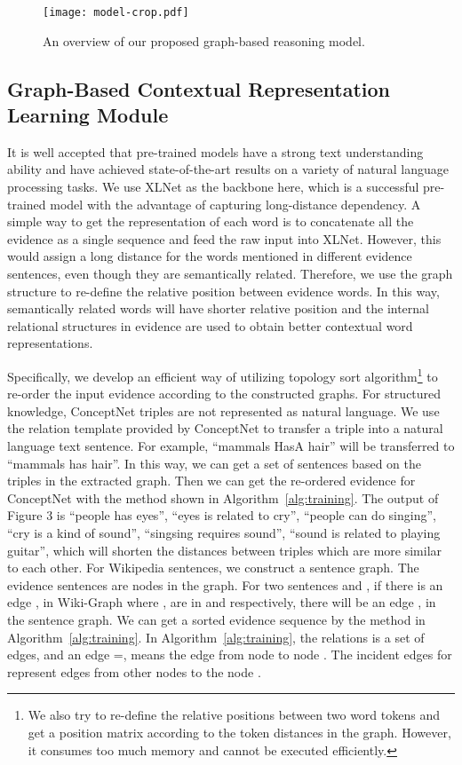 \documentclass[letterpaper]{article} \usepackage{aaai20}  \usepackage{times}  \usepackage{helvet} \usepackage{courier}  \usepackage[hyphens]{url}  \usepackage{graphicx} \urlstyle{rm} \def\UrlFont{\rm}  \usepackage{graphicx}  \frenchspacing  \setlength{\pdfpagewidth}{8.5in}  \setlength{\pdfpageheight}{11in}
\begin{document}
\begin{figure}[htbp]
	\centering
	\texttt{[image: model-crop.pdf]}
	\caption{An overview of our proposed graph-based reasoning model.}
	\label{fig:model}
\end{figure}

\subsection{Graph-Based Contextual Representation Learning Module}

It is well accepted that pre-trained models have a strong text understanding ability and have achieved state-of-the-art results on a variety of natural language processing tasks. 
We use XLNet \cite{xlnet2019yang} as the backbone here, which is a successful pre-trained model with the advantage of capturing long-distance dependency.
A simple way to get the representation of each word is to concatenate all the evidence as a single sequence and feed the raw input into XLNet.
However, this would assign a long distance for the words mentioned in different evidence sentences, even though they are semantically related.
Therefore, we use the graph structure to re-define the relative position between evidence words. In this way, semantically related words will have shorter relative position and the internal relational structures in evidence are used to obtain better contextual word representations.

Specifically, we develop an efficient way of utilizing topology sort algorithm\footnote{We also try to re-define the relative positions between two word tokens and get a position matrix according to the token distances in the graph. However, it consumes too much memory and cannot be executed efficiently.} to re-order the input evidence according to the constructed graphs. 
For structured knowledge, ConceptNet triples are not represented as natural language. We use the relation template provided by ConceptNet to transfer a triple into a natural language text sentence.
For example, ``mammals HasA hair'' will be transferred to ``mammals has hair''. In this way, we can get a set of sentences  based on the triples in the extracted graph. Then we can get the re-ordered evidence  for  ConceptNet  with the method shown in Algorithm~\ref{alg:training}. The output of Figure 3 is ``people has eyes'', ``eyes is related to cry'', ``people can do singing'', ``cry is a kind of sound'', ``singsing requires sound'', ``sound is related to playing guitar'', which will shorten the distances between triples which are more similar to each other.
For Wikipedia sentences, we construct a sentence graph. The evidence sentences  are nodes in the graph. For two sentences  and , if there is an edge ,  in Wiki-Graph where ,  are in  and  respectively, there will be an edge ,  in the sentence graph. We can get a sorted evidence sequence  by the method in Algorithm~\ref{alg:training}. In Algorithm~\ref{alg:training}, the relations  is a set of edges, and an edge =, means the edge from node  to node . The incident edges for  represent edges from other nodes to the node .  
\end{document}
